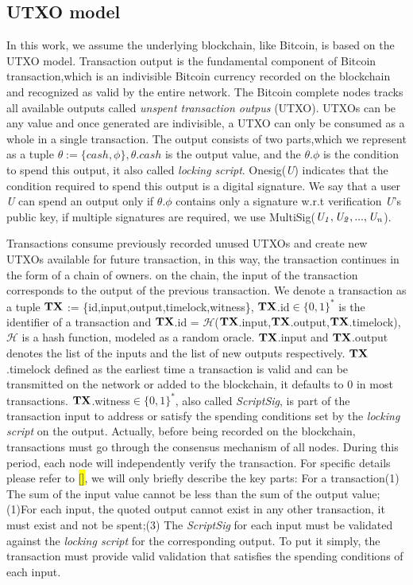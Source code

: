 \documentclass[conference]{IEEEtran}
\begin{document}
\subsection{UTXO model}

In this work, we assume the underlying blockchain, like Bitcoin, is based on the UTXO model. Transaction output is the fundamental 
component of Bitcoin transaction,which is an indivisible Bitcoin currency recorded on the blockchain and recognized as valid by 
the entire network. The Bitcoin complete nodes tracks all available outputs called \emph{unspent transaction outpus} (UTXO). 
UTXOs can be any value and once generated are indivisible, a UTXO can only be consumed as a whole in a single transaction. 
The output consists of two parts,which we represent as a tuple $\theta :=\{cash,\phi\}, \theta.cash$ is the output value,
 and the $\theta.\phi$ is the condition to spend this output, it also called \emph{locking script}. Onesig(\emph{U}) indicates 
 that the condition required to spend this output is a digital signature. We say that a user \emph{U} can spend an output only if
 $\theta.\phi$ contains only a signature w.r.t verification \emph{U}'s public key, if multiple signatures are required, we use 
 MultiSig($\it U_1,U_2,...,U_n$).


 Transactions consume previously recorded unused UTXOs and create new UTXOs available for future transaction, in this way, the 
 transaction continues in the form of a chain of owners. on the chain, the input of the transaction corresponds to the output 
 of the previous transaction. We denote a transaction as a tuple $\bf TX$ := \{id,input,output,timelock,witness\}, $\bf TX$.id$\in\{0,1\}^*$
 is the identifier of a transaction and $\bf TX$.id = $\mathcal H$($\bf TX$.input,$\bf TX$.output,$\bf TX$.timelock), $\mathcal H$ is a hash function,
 modeled as a random oracle. $\bf TX$.input and $\bf TX$.output denotes the list of the inputs and the list of new outputs respectively.
 $\bf TX$.timelock defined as the earliest time a transaction is valid and can be transmitted on the network or added to the blockchain, 
 it defaults to 0 in most transactions. $\bf TX$.witness$\in\{0,1\}^*$, also called \emph{ScriptSig}, is part of the transaction input to address or satisfy the spending 
 conditions set by the \emph{locking script} on the output. Actually, before being recorded on the blockchain, transactions must go
 through the consensus mechanism of all nodes. During this period, each node will independently verify the transaction. For specific 
 details please refer to \colorbox{yellow}{[]}, we will only briefly describe the key parts: For a transaction(1) The sum of the input value cannot be less 
 than the sum of the output value;(1)For each input, the quoted output cannot exist in any other transaction, it must exist and not 
 be spent;(3) The \emph{ScriptSig} for each input must be validated against the \emph{locking script} for the corresponding output.
 To put it simply, the transaction must provide valid validation that satisfies the spending conditions of each input.
\end{document}
